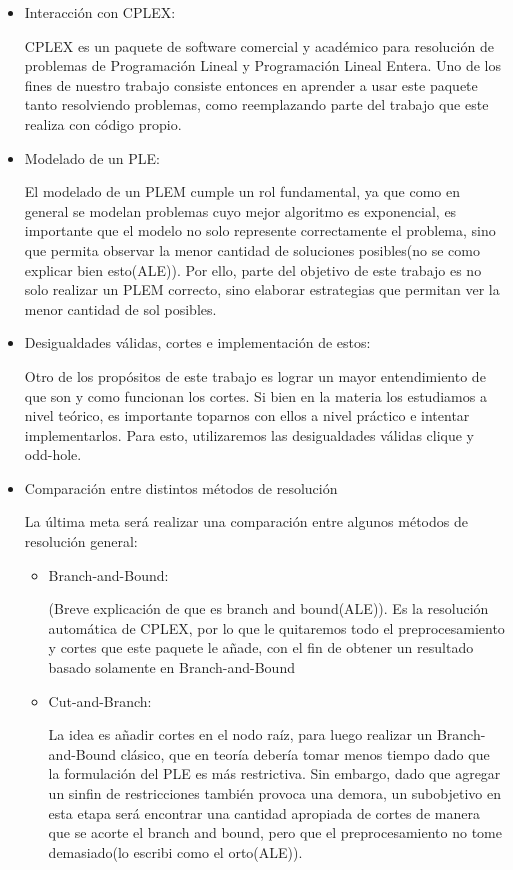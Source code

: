 \documentclass[a4paper]{article}
\begin{document}
\begin{itemize}

	\item Interacción con CPLEX:
	
	CPLEX es un paquete de software comercial y académico para resolución de problemas de Programación Lineal y Programación Lineal Entera. Uno de los fines de nuestro trabajo consiste entonces en aprender a usar este paquete tanto resolviendo problemas, como reemplazando parte del trabajo que este realiza con código propio.
	
	\item Modelado de un PLE:
	
	El modelado de un PLEM cumple un rol fundamental, ya que como en general se modelan problemas cuyo mejor algoritmo es exponencial, es importante que el modelo no solo represente correctamente el problema, sino que permita observar la menor cantidad de soluciones posibles(no se como explicar bien esto(ALE)). Por ello, parte del objetivo de este trabajo es no solo realizar un PLEM correcto, sino elaborar estrategias que permitan ver la menor cantidad de sol posibles.
	
	\item Desigualdades válidas, cortes e implementación de estos:
	
	Otro de los propósitos de este trabajo es lograr un mayor entendimiento de que son y como funcionan los cortes. Si bien en la materia los estudiamos a nivel teórico, es importante toparnos con ellos a nivel práctico e intentar implementarlos. Para esto, utilizaremos las desigualdades válidas clique y odd-hole.

	\item Comparación entre distintos métodos de resolución
	
	La última meta será realizar una comparación entre algunos métodos de resolución general:
	\begin{itemize}
	
		\item Branch-and-Bound:
		
		(Breve explicación de que es branch and bound(ALE)). Es la resolución automática de CPLEX, por lo que le quitaremos todo el preprocesamiento y cortes que este paquete le añade, con el fin de obtener un resultado basado solamente en Branch-and-Bound 
		
		\item Cut-and-Branch:
		
		La idea es añadir cortes en el nodo raíz, para luego realizar un Branch-and-Bound clásico, que en teoría debería tomar menos tiempo dado que la formulación del PLE es más restrictiva. Sin embargo, dado que agregar un sinfin de restricciones también provoca una demora, un subobjetivo en esta etapa será encontrar una cantidad apropiada de cortes de manera que se acorte el branch and bound, pero que el preprocesamiento no tome demasiado(lo escribi como el orto(ALE)).
	
	\end{itemize}
	
	
\end{itemize}
\end{document}
